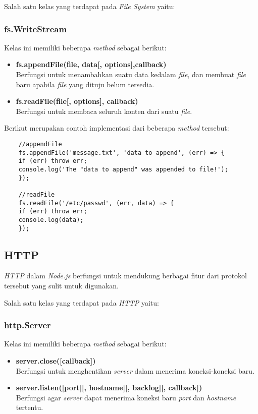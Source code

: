 Salah satu kelas yang terdapat pada \textit{File System} yaitu: 

\subsubsection{fs.WriteStream}
Kelas ini memiliki beberapa \textit{method} sebagai berikut: 

\begin{itemize}
	\item \textbf{fs.appendFile(file, data[, options],callback)} \\ Berfungsi untuk menambahkan suatu data kedalam \textit{file}, dan membuat \textit{file} baru apabila \textit{file} yang dituju belum tersedia.
	\item \textbf{fs.readFile(file[, options], callback)} \\ Berfungsi untuk membaca seluruh konten dari suatu \textit{file}.
\end{itemize}

Berikut merupakan contoh implementasi dari beberapa \textit{method} tersebut:

\begin{lstlisting}
	//appendFile
	fs.appendFile('message.txt', 'data to append', (err) => {
	if (err) throw err;
	console.log('The "data to append" was appended to file!');
	});
	
	//readFile
	fs.readFile('/etc/passwd', (err, data) => {
	if (err) throw err;
	console.log(data);
	});
\end{lstlisting}

\subsection{HTTP}
\textit{HTTP} dalam \textit{Node.js} berfungsi untuk mendukung berbagai fitur dari protokol tersebut yang sulit untuk digunakan. 

Salah satu kelas yang terdapat pada \textit{HTTP} yaitu: 

\subsubsection{http.Server}
Kelas ini memiliki beberapa \textit{method} sebagai berikut: 

\begin{itemize}
	\item \textbf{server.close([callback])} \\ Berfungsi untuk menghentikan \textit{server} dalam menerima koneksi-koneksi baru.
	\item \textbf{server.listen([port][, hostname][, backlog][, callback])} \\ Berfungsi agar \textit{server} dapat menerima koneksi baru \textit{port} dan \textit{hostname} tertentu.
\end{itemize}

